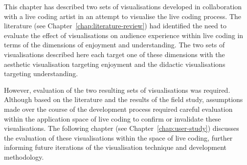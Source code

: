 This chapter has described two sets of visualisations developed in collaboration with a live coding artist in an attempt to visualise the live coding process. The literature (see Chapter~\ref{chap:literature-review}) had identified the need to evaluate the effect of visualisations on audience experience within live coding in terms of the dimensions of enjoyment and understanding. The two sets of visualisations described here each target one of these dimensions with the aesthetic visualisation targeting enjoyment and the didactic visualisations targeting understanding. 

However, evaluation of the two resulting sets of visualisations was required. Although based on the literature and the results of the field study, assumptions made over the course of the development process required careful evaluation within the application space of live coding to confirm or invalidate these visualisations. The following chapter (see Chapter~\ref{chap:user-study}) discusses the evaluation of these visualisations within the space of live coding, further informing future iterations of the visualisation technique and development methodology.



